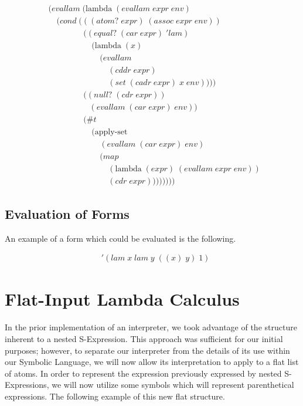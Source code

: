 \begin{figure}[ht]
\caption{}\label{scheme}
\begin{align*}
& (evallam \; (\text{lambda} \; (evallam \; expr \; env)
\\& \quad (cond \; (((atom? \; expr) \; (assoc \; expr \; env))
\\& \qquad \qquad \; ((equal? \; (car \; expr) \; 'lam) \; 
\\& \qquad \qquad \quad \; (\text{lambda} \; (x) \; 
\\& \qquad \qquad \qquad \; (evallam \; 
\\& \qquad \qquad \qquad \quad \; (cddr \; expr) \; 
\\& \qquad \qquad \qquad \quad \; (set \; (cadr \; expr) \; x \; env))))
\\& \qquad \qquad \; ((null? \; (cdr \; expr)) \; 
\\& \qquad \qquad \quad (evallam \; (car \; expr) \; env))
\\& \qquad \qquad \; (\#t \; 
\\& \qquad \qquad \quad \; (\text{apply-set} \; 
\\& \qquad \qquad \qquad \; (evallam \; (car \; expr) \; env) \; 
\\& \qquad \qquad \qquad \; (map \; 
\\& \qquad \qquad \qquad \quad \; (\text{lambda} \; (expr) \; (evallam \; expr \; env)) \; 
\\& \qquad \qquad \qquad \quad \; (cdr \; expr))))))))
\end{align*}
\end{figure}

\subsection{Evaluation of Forms}
An example of a form which could be evaluated is the following.

\begin{figure}[ht]
\caption{}\label{scheme}
\begin{align*}
& '(lam \; x \; lam \; y \; ((x) \; y) \; 1)
\end{align*}
\end{figure}

\section{Flat-Input Lambda Calculus}
In the prior implementation of an interpreter, we took advantage of the structure 
inherent to a nested S-Expression. This approach was sufficient for our initial 
purposes; however, to separate our interpreter from the details of its use within 
our Symbolic Language, we will now allow its interpretation to apply to a flat 
list of atoms.
In order to represent the expression previously expressed by nested S-Expressions, 
we will now utilize some symbols which will represent parenthetical expressions. 
The following example of this new flat structure.

